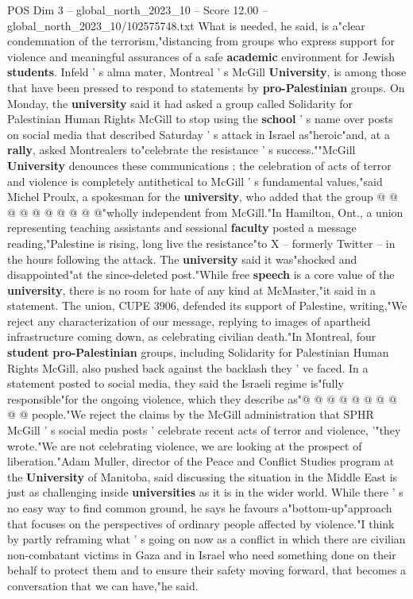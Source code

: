 \begin{textsample}{POS Dim 3 – global\_north\_2023\_10 – Score 12.00 – global\_north\_2023\_10/102575748.txt}
What is needed, he said, is a"clear condemnation of the terrorism,"distancing from groups who express support for violence and meaningful assurances of a safe \textbf{academic} environment for Jewish \textbf{students}.
Infeld ' s alma mater, Montreal ' s McGill \textbf{University}, is among those that have been pressed to respond to statements by \textbf{pro-Palestinian} groups.
On Monday, the \textbf{university} said it had asked a group called Solidarity for Palestinian Human Rights McGill to stop using the \textbf{school} ' s name over posts on social media that described Saturday ' s attack in Israel as"heroic"and, at a \textbf{rally}, asked Montrealers to"celebrate the resistance ' s success.""McGill \textbf{University} denounces these communications ; the celebration of acts of terror and violence is completely antithetical to McGill ' s fundamental values,"said Michel Proulx, a spokesman for the \textbf{university}, who added that the group @ @ @ @ @ @ @ @ @ @"wholly independent from McGill."In Hamilton, Ont., a union representing teaching assistants and sessional \textbf{faculty} posted a message reading,"Palestine is rising, long live the resistance"to X -- formerly Twitter -- in the hours following the attack.
The \textbf{university} said it was"shocked and disappointed"at the since-deleted post."While free \textbf{speech} is a core value of the \textbf{university}, there is no room for hate of any kind at McMaster,"it said in a statement.
The union, CUPE 3906, defended its support of Palestine, writing,"We reject any characterization of our message, replying to images of apartheid infrastructure coming down, as celebrating civilian death."In Montreal, four \textbf{student} \textbf{pro-Palestinian} groups, including Solidarity for Palestinian Human Rights McGill, also pushed back against the backlash they ' ve faced.
In a statement posted to social media, they said the Israeli regime is"fully responsible"for the ongoing violence, which they describe as"@ @ @ @ @ @ @ @ @ @ people."We reject the claims by the McGill administration that SPHR McGill ' s social media posts ' celebrate recent acts of terror and violence, '"they wrote."We are not celebrating violence, we are looking at the prospect of liberation."Adam Muller, director of the Peace and Conflict Studies program at the \textbf{University} of Manitoba, said discussing the situation in the Middle East is just as challenging inside \textbf{universities} as it is in the wider world.
While there ' s no easy way to find common ground, he says he favours a"bottom-up"approach that focuses on the perspectives of ordinary people affected by violence."I think by partly reframing what ' s going on now as a conflict in which there are civilian non-combatant victims in Gaza and in Israel who need something done on their behalf to protect them and to ensure their safety moving forward, that becomes a conversation that we can have,"he said.

\end{textsample}
